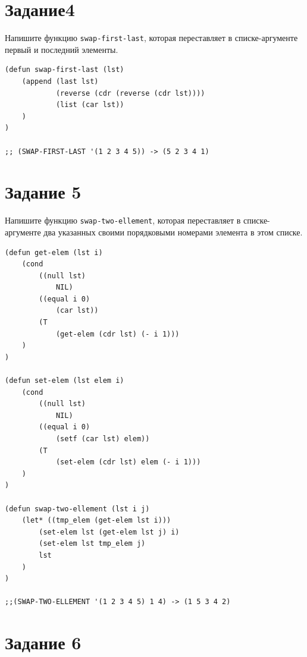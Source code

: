 \documentclass[a4paper,14pt, unknownkeysallowed]{extreport}
\begin{document}
\section{Задание4}

Напишите функцию \texttt{swap-first-last}, которая переставляет в списке-аргументе первый и последний элементы.

\begin{center}
\captionsetup{justification=raggedright,singlelinecheck=off}
\begin{lstlisting}[label=lst:parallel_processing,caption=Решение задания 4]
(defun swap-first-last (lst)
    (append (last lst) 
            (reverse (cdr (reverse (cdr lst))))
            (list (car lst))
    )
) 

;; (SWAP-FIRST-LAST '(1 2 3 4 5)) -> (5 2 3 4 1)

\end{lstlisting}
\end{center}

\section{Задание 5}

Напишите функцию \texttt{swap-two-ellement}, которая переставляет в списке-аргументе два указанных своими порядковыми номерами элемента в этом списке.

\begin{center}
\captionsetup{justification=raggedright,singlelinecheck=off}
\begin{lstlisting}[label=lst:parallel_processing,caption=Решение задания 5]
(defun get-elem (lst i)
    (cond
        ((null lst)
            NIL)
        ((equal i 0)
            (car lst))
        (T 
            (get-elem (cdr lst) (- i 1)))
    )
)

(defun set-elem (lst elem i)
    (cond
        ((null lst)
            NIL)
        ((equal i 0)
            (setf (car lst) elem))
        (T 
            (set-elem (cdr lst) elem (- i 1)))
    )
)

(defun swap-two-ellement (lst i j)
    (let* ((tmp_elem (get-elem lst i)))
        (set-elem lst (get-elem lst j) i)
        (set-elem lst tmp_elem j)
        lst
    )
)

;;(SWAP-TWO-ELLEMENT '(1 2 3 4 5) 1 4) -> (1 5 3 4 2)
\end{lstlisting}
\end{center}

\section{Задание 6}
\end{document}
